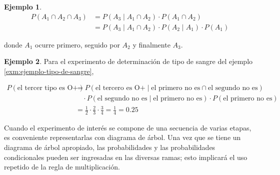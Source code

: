 \documentclass[
  11pt,
]{book}
\theoremstyle{definition}
\theoremstyle{definition}
\newtheorem{example}{Ejemplo}[chapter]
\theoremstyle{definition}
\theoremstyle{definition}
\theoremstyle{remark}
\begin{document}
\begin{example}
\begin{equation}
\begin{split}
P(A_1 \cap A_2 \cap A_3) &= P(A_3 \mid A_1 \cap A_2) \cdot P(A_1 \cap A_2)\\
&= P(A_3 \mid A_1 \cap A_2) \cdot P(A_2 \mid A_1) \cdot P(A_1) 
\end{split}
\label{eq:triple-interseccion-ejemplo-tipo-de-sangre}
\end{equation}

donde \(A_1\) ocurre primero, seguido por \(A_2\) y finalmente \(A_3\).
\end{example}

\begin{example}
Para el experimento de determinación de tipo de sangre del ejemplo \ref{exm:ejemplo-tipo-de-sangre},

\[
\begin{aligned}
P(\text{el tercer tipo es O+}) &= P(\text{el tercero es O+} \mid \text{el primero no es} \cap \text{el segundo no es}) \\
&\quad \cdot P(\text{el segundo no es} \mid \text{el primero no es}) \cdot P(\text{el primero no es}) \\
&= \frac{1}{2} \cdot \frac{2}{3} \cdot \frac{3}{4} = \frac{1}{4} = 0.25
\end{aligned}
\]

Cuando el experimento de interés se compone de una secuencia de varias etapas, es conveniente representarlas con diagrama de árbol. Una vez que se tiene un diagrama de árbol apropiado, las probabilidades y las probabilidades condicionales pueden ser ingresadas en las diversas ramas; esto implicará el uso repetido de la regla de multiplicación.
\end{example}
\end{document}
